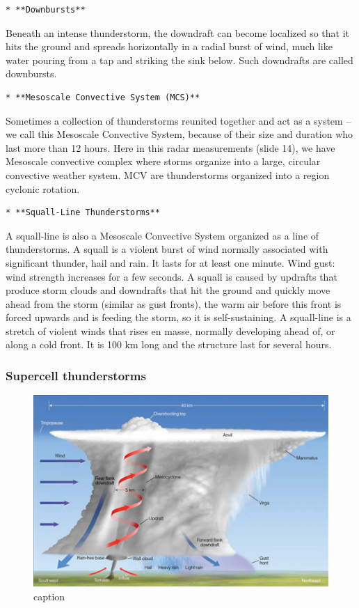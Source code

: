\documentclass[12pt,oneside]{book}
\begin{document}
\begin{verbatim}
* **Downbursts**
\end{verbatim}

Beneath an intense thunderstorm, the downdraft can become localized so
that it hits the ground and spreads horizontally in a radial burst of
wind, much like water pouring from a tap and striking the sink below.
Such downdrafts are called downbursts.

\begin{verbatim}
* **Mesoscale Convective System (MCS)**
\end{verbatim}

Sometimes a collection of thunderstorms reunited together and act as a
system -- we call this Mesoscale Convective System, because of their
size and duration who last more than 12 hours. Here in this radar
measurements (slide 14), we have Mesoscale convective complex where
storms organize into a large, circular convective weather system. MCV
are thunderstorms organized into a region cyclonic rotation.

\begin{verbatim}
* **Squall-Line Thunderstorms**
\end{verbatim}

A squall-line is also a Mesoscale Convective System organized as a line
of thunderstorms. A squall is a violent burst of wind normally
associated with significant thunder, hail and rain. It lasts for at
least one minute. Wind gust: wind strength increases for a few seconds.
A squall is caused by updrafts that produce storm clouds and downdrafts
that hit the ground and quickly move ahead from the storm (similar as
gust fronts), the warm air before this front is forced upwards and is
feeding the storm, so it is self-sustaining. A squall-line is a stretch
of violent winds that rises en masse, normally developing ahead of, or
along a cold front. It is 100 km long and the structure last for several
hours.

\subsubsection{Supercell thunderstorms}\label{supercell-thunderstorms}

\begin{figure}

{\centering \includegraphics[width=0.8\linewidth]{figures/FigureE4} 

}

\caption{caption}\label{fig:Supercellthunderstorms}
\end{figure}
\end{document}
